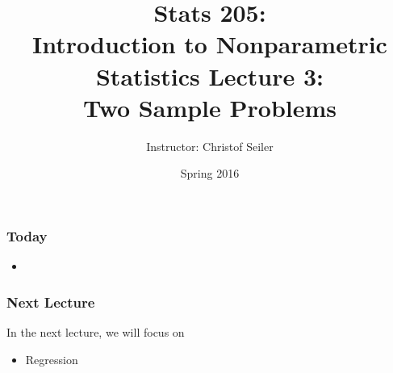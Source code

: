 \documentclass[10pt]{beamer}
\title{\large \bfseries Stats 205: \\ Introduction to Nonparametric Statistics \linebreak \linebreak \linebreak
Lecture 3: \\ Two Sample Problems}
\author{Instructor: Christof Seiler}
\date{Spring 2016}
\begin{document}
\frame{
\thispagestyle{empty}
\titlepage
}

\begin{frame}
\frametitle{Today}

\begin{itemize}
\item 
\end{itemize}

\end{frame}

\begin{frame}
\frametitle{Next Lecture}

In the next lecture, we will focus on
\begin{itemize}
\item Regression
\end{itemize}

\end{frame}
\end{document}
